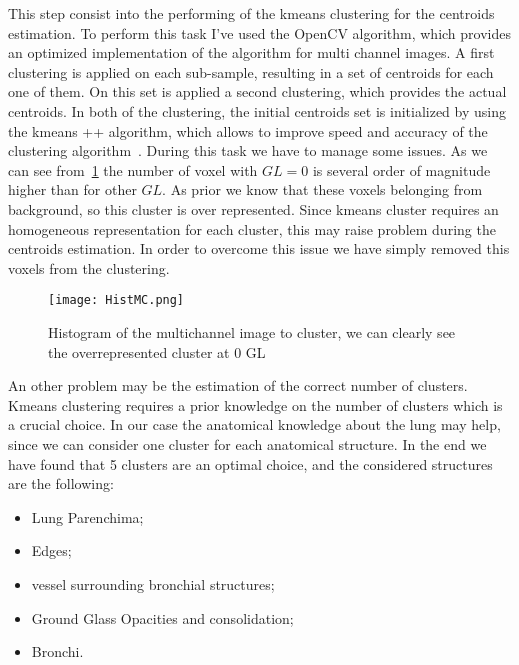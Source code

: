 		This step consist into the performing of the kmeans clustering for the centroids estimation. To perform this task I've used the OpenCV algorithm, which provides an optimized implementation of the algorithm for multi channel images. A first clustering is applied on each sub-sample, resulting in a set of centroids for each one of them. On this set is applied a second clustering, which provides the actual centroids. In both of the clustering, the initial centroids set is initialized by using the kmeans ++ algorithm, which allows to improve speed and accuracy of the clustering algorithm~\cite{Arthur2007}.
		During this task we have to manage some issues. As we can see from \figurename\,\ref{fig:ClusteringHistogram} the number of voxel with $GL = 0$  is several order of magnitude higher than for other $GL$. As prior we know that these voxels belonging from background, so this cluster is over represented. Since kmeans cluster requires an homogeneous representation for each cluster, this may raise problem during the centroids estimation. In order to overcome this issue we have simply removed this voxels from the clustering.  
		

		\begin{figure}[h!]
			\centering
				\texttt{[image: HistMC.png]}
				\caption{Histogram of the multichannel image to cluster, we can clearly see the overrepresented cluster at $0$ GL}	\label{fig:ClusteringHistogram}
		\end{figure}
		
	An other problem may be the estimation of the correct number of clusters. Kmeans clustering requires a prior knowledge on the number of clusters which is a crucial choice. In our case the anatomical knowledge about the lung may help, since we can consider one cluster for each anatomical structure. In the end we have found that 5 clusters are an optimal choice, and the considered structures are the following: 
	\begin{itemize}
		\item Lung Parenchima;
		
		\item Edges;
		
		\item vessel surrounding bronchial structures;
		
		\item Ground Glass Opacities and consolidation;
		
		\item Bronchi.

	\end{itemize}

